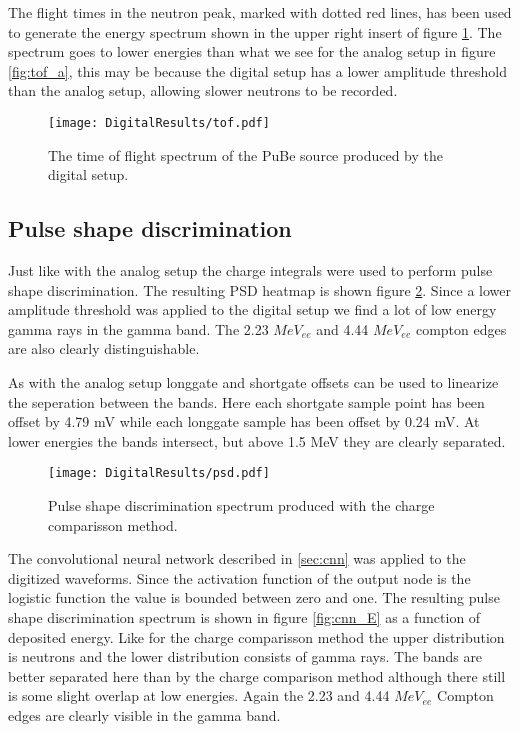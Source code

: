 \documentclass[main.tex]{subfiles}
\begin{document}
The flight times in the neutron peak, marked with dotted red lines, has been used to generate the energy spectrum shown in the upper right insert of figure \ref{fig:tof_d}. The spectrum goes to lower energies than what we see for the analog setup in figure \ref{fig:tof_a}, this may be because the digital setup has a lower amplitude threshold than the analog setup, allowing slower neutrons to be recorded.
\begin{figure}[ht]
    \centering
        \texttt{[image: DigitalResults/tof.pdf]}
        \caption{The time of flight spectrum of the PuBe source produced by the digital setup.}
    \label{fig:tof_d} 
\end{figure}



\subsection{Pulse shape discrimination}
Just like with the analog setup the charge integrals were used to perform pulse shape discrimination. The resulting PSD heatmap is shown figure \ref{fig:psd_d}. Since a lower amplitude threshold was applied to the digital setup we find a lot of low energy gamma rays in the gamma band. The 2.23 $MeV_{ee}$ and 4.44 $MeV_{ee}$ compton edges are also clearly distinguishable. 

As with the analog setup longgate and shortgate offsets can be used to linearize the seperation between the bands. Here each shortgate sample point has been offset by 4.79 mV while each longgate sample has been offset by 0.24 mV. At lower energies the bands intersect, but above 1.5 MeV they are clearly separated.

\begin{figure}[ht]
    \centering
        \texttt{[image: DigitalResults/psd.pdf]}
        \caption{Pulse shape discrimination spectrum produced with the charge comparisson method.}
        \label{fig:psd_d}
\end{figure}

The convolutional neural network described in \ref{sec:cnn} was applied to the digitized waveforms. Since the activation function of the output node is the logistic function the value is bounded between zero and one. The resulting pulse shape discrimination spectrum is shown in figure \ref{fig:cnn_E} as a function of deposited energy. Like for the charge comparisson method the upper distribution is neutrons and the lower distribution consists of gamma rays. The bands are better separated here than by the charge comparison method although there still is some slight overlap at low energies. Again the 2.23 and 4.44 $MeV_{ee}$ Compton edges are clearly visible in the gamma band. 
\end{document}
